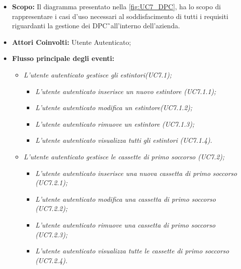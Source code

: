 		\begin{itemize}
			\item \textbf{Scopo:} Il diagramma presentato nella \autoref{fig:UC7_DPC}, ha lo scopo di rappresentare i casi d'uso necessari al soddisfacimento di tutti i requisiti riguardanti la gestione dei \gls{DPC}\G\ all'interno dell'azienda. \\ 
			\item \textbf{Attori Coinvolti:} Utente Autenticato;
			\item \textbf{Flusso principale degli eventi:} 
			\begin{itemize}
				\item \textit{L'utente autenticato gestisce gli estintori(UC7.1);}
				\begin{itemize}
					\item \textit{L'utente autenticato inserisce un nuovo estintore (UC7.1.1);}
					\item \textit{L'utente autenticato modifica un estintore(UC7.1.2);}
					\item \textit{L'utente autenticato rimuove un estintore (UC7.1.3);}
					\item \textit{L'utente autenticato visualizza tutti gli estintori (UC7.1.4).}
				\end{itemize}
				\item \textit{L'utente autenticato gestisce le cassette di primo soccorso (UC7.2);}
				\begin{itemize}
					\item \textit{L'utente autenticato inserisce una nuova cassetta di primo soccorso (UC7.2.1);}
					\item \textit{L'utente autenticato modifica una cassetta di primo soccorso (UC7.2.2);}
					\item \textit{L'utente autenticato rimuove una cassetta di primo soccorso (UC7.2.3);}
					\item \textit{L'utente autenticato visualizza tutte le cassette di primo soccorso (UC7.2.4).}
				\end{itemize}
			\end{itemize}
		\end{itemize}

\newpage

